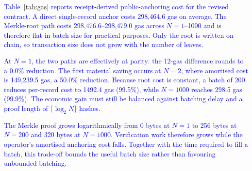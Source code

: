 \documentclass[final,5p,times,twocolumn]{elsarticle}
\begin{document}
\textcolor{blue}{Table~\ref{tab:gas} reports receipt-derived public-anchoring cost for the revised contract. A direct single-record anchor costs 298{,}464.6 gas on average. The Merkle-root path costs 298{,}476.6--298{,}479.0 gas across $N=1$--1000 and is therefore flat in batch size for practical purposes. Only the root is written on chain, so transaction size does not grow with the number of leaves.}

\textcolor{blue}{At $N=1$, the two paths are effectively at parity: the 12-gas difference rounds to a 0.0\% reduction. The first material saving occurs at $N=2$, where amortised cost is 149{,}239.5 gas, a 50.0\% reduction. Because root cost is constant, a batch of 200 reduces per-record cost to 1492.4 gas (99.5\%), while $N=1000$ reaches 298.5 gas (99.9\%). The economic gain must still be balanced against batching delay and a proof length of $\lceil\log_2N\rceil$ hashes.}

\textcolor{blue}{The Merkle proof grows logarithmically from 0 bytes at $N=1$ to 256 bytes at $N=200$ and 320 bytes at $N=1000$. Verification work therefore grows while the operator's amortised anchoring cost falls. Together with the time required to fill a batch, this trade-off bounds the useful batch size rather than favouring unbounded batching.}
\end{document}
